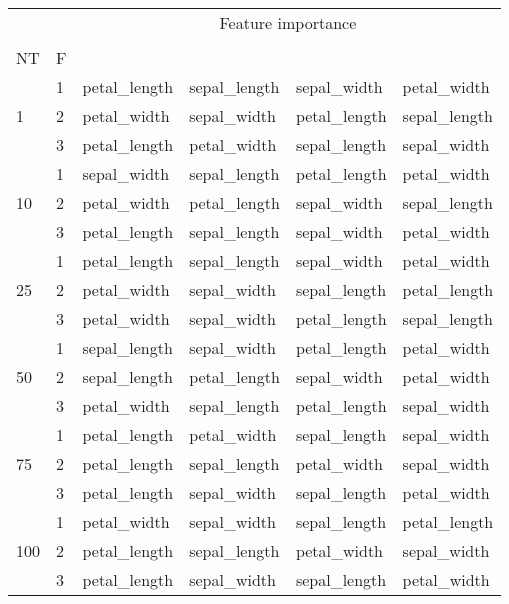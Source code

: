 \begin{table}[htbp]
\centering
\label{iris-features}
\begin{tabular}{llllll}
\toprule
 &  & \multicolumn{4}{c}{Feature importance} \\
 &  & #1 & #2 & #3 & #4 \\
NT & F &  &  &  &  \\
\midrule
\multirow[c]{3}{*}{1} & 1 & petal_length & sepal_length & sepal_width & petal_width \\
 & 2 & petal_width & sepal_width & petal_length & sepal_length \\
 & 3 & petal_length & petal_width & sepal_length & sepal_width \\
\multirow[c]{3}{*}{10} & 1 & sepal_width & sepal_length & petal_length & petal_width \\
 & 2 & petal_width & petal_length & sepal_width & sepal_length \\
 & 3 & petal_length & sepal_length & sepal_width & petal_width \\
\multirow[c]{3}{*}{25} & 1 & petal_length & sepal_length & sepal_width & petal_width \\
 & 2 & petal_width & sepal_width & sepal_length & petal_length \\
 & 3 & petal_width & sepal_width & petal_length & sepal_length \\
\multirow[c]{3}{*}{50} & 1 & sepal_length & sepal_width & petal_length & petal_width \\
 & 2 & sepal_length & petal_length & sepal_width & petal_width \\
 & 3 & petal_width & sepal_length & petal_length & sepal_width \\
\multirow[c]{3}{*}{75} & 1 & petal_length & petal_width & sepal_length & sepal_width \\
 & 2 & petal_length & sepal_length & petal_width & sepal_width \\
 & 3 & petal_length & sepal_width & sepal_length & petal_width \\
\multirow[c]{3}{*}{100} & 1 & petal_width & sepal_width & sepal_length & petal_length \\
 & 2 & petal_length & sepal_length & petal_width & sepal_width \\
 & 3 & petal_length & sepal_width & sepal_length & petal_width \\
\bottomrule
\end{tabular}
\end{table}
